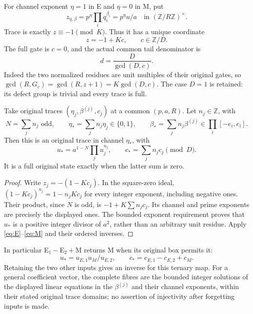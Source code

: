 For channel exponent $\eta=1$ in E and $\eta=0$ in M, put
\[
 z_{\eta,\beta}=p^\eta\prod_iq_i^{\beta_i}=p^\eta u/a
 \quad\text{in }(\mathbb Z/R\mathbb Z)^\times.
\]
Trace is exactly $z\equiv-1\pmod K$. Thus it has a unique coordinate
\begin{equation}\label{eq:defect}
 z=-1+Kc,\qquad c\in\mathbb Z/D.
\end{equation}
The full gate is $c=0$, and the actual common tail denominator is
\begin{equation}\label{eq:denorder}
 d=\frac{D}{\gcd(D,c)}.
\end{equation}
Indeed the two normalized residues are unit multiples of their original gates,
so $\gcd(R,G_c)=\gcd(R,z+1)=K\gcd(D,c)$.
The case $D=1$ is retained: its defect group is trivial and every trace is full.

\begin{theorem}\label{thm:mixed}
Take original traces $(\eta_j,\beta^{(j)},c_j)$ at a common $(p,a,R)$.
Let $n_j\in\mathbb Z$, with
\[
 N=\sum_jn_j\text{ odd},\qquad
 \eta_* =\sum_jn_j\eta_j\in\{0,1\},\qquad
 \beta_* =\sum_jn_j\beta^{(j)}\in\prod_i[-e_i,e_i].
\]
Then this is an original trace in channel $\eta_*$, with
\begin{equation}\label{eq:mixed}
 u_*=a^{1-N}\prod_j u_j^{n_j},\qquad
 c_*=\sum_jn_jc_j\pmod D.
\end{equation}
It is a full original state exactly when the latter sum is zero.
\end{theorem}
\begin{proof}
Write $z_j=-(1-Kc_j)$. In the square-zero ideal,
$(1-Kc_j)^{n_j}=1-n_jKc_j$ for every integer exponent, including negative
ones. Their product, since $N$ is odd, is
$-1+K\sum n_jc_j$. Its channel and prime exponents are precisely the displayed
ones. The bounded exponent requirement proves that $u_*$ is a positive integer
divisor of $a^2$, rather than an arbitrary unit residue. Apply
\eqref{eq:E}--\eqref{eq:M} and their ordered inverses.
\end{proof}

In particular E$_1-$E$_2+$M returns M when its original box permits it:
\[
 u_*=u_{E,1}u_M/u_{E,2},\qquad c_*=c_{E,1}-c_{E,2}+c_M.
\]
Retaining the two other inputs gives an inverse for this ternary map.
For a general coefficient vector, the complete fibres are the bounded integer
solutions of the displayed linear equations in the $\beta^{(j)}$ and their
channel exponents, within their stated original trace domains; no assertion of injectivity after forgetting inputs is made.

